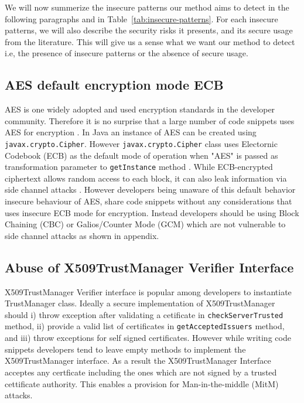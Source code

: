 We will now summerize the insecure patterns our method aims to detect in the following paragraphs and in Table~\ref{tab:insecure-patterns}. 
For each insecure patterns, we will also describe the security risks it presents, and its secure usage from the literature. 
This will give us a sense what we want our method to detect i.e, the presence of insecure patterns or the absence of secure usage.


\subsection{AES default encryption mode ECB }
AES is one widely adopted and used encryption standards in the developer community. Therefore it is no surprise that a large number of code snippets uses AES for encryption . In Java an instance of AES can be created using \texttt{javax.crypto.Cipher}. However \texttt{javax.crypto.Cipher} class uses Electornic Codebook (ECB) as the default mode of operation when  "AES" is passed as transformation parameter to \texttt{getInstance} method . While ECB-encrypted ciphertext allows random access to each block, it can also leak information via side channel attacks . However developers being unaware of this default behavior insecure behaviour of AES, share code snippets without any considerations that uses insecure ECB mode for encryption. Instead developers should be using Block Chaining (CBC) or Galios/Counter Mode (GCM) which are not vulnerable to side channel attacks as shown in appendix.

\subsection{Abuse of X509TrustManager Verifier Interface}
X509TrustManager Verifier interface is popular among developers to instantiate TrustManager class. Ideally a secure implementation of X509TrustManager should i) throw exception after validating a cetificate in \texttt{checkServerTrusted} method, ii) provide a valid list of certificates in \texttt{getAcceptedIssuers} method, and iii) throw exceptions for self signed certificates. However while writing code snippets developers tend to leave empty methods to implement  the X509TrustManager interface. As a result the X509TrustManager Interface acceptes any certficate including the ones which are not signed by a trusted cettificate authority. This enables a provision for Man-in-the-middle (MitM) attacks.  

